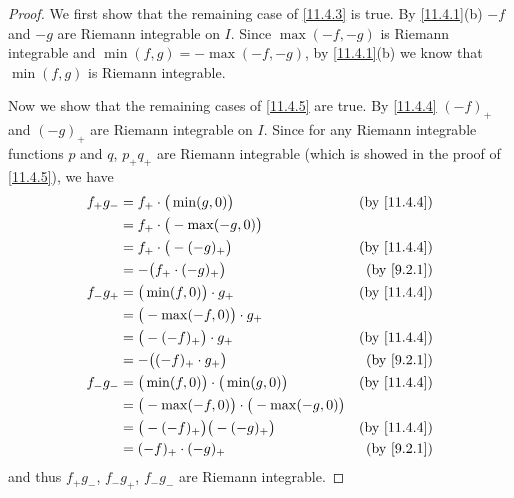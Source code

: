 \begin{proof}
  We first show that the remaining case of \cref{11.4.3} is true.
  By \cref{11.4.1}(b) \(-f\) and \(-g\) are Riemann integrable on \(I\).
  Since \(\max(-f, -g)\) is Riemann integrable and \(\min(f, g) = -\max(-f, -g)\), by \cref{11.4.1}(b) we know that \(\min(f, g)\) is Riemann integrable.

  Now we show that the remaining cases of \cref{11.4.5} are true.
  By \cref{11.4.4} \((-f)_+\) and \((-g)_+\) are Riemann integrable on \(I\).
  Since for any Riemann integrable functions \(p\) and \(q\), \(p_+ q_+\) are Riemann integrable (which is showed in the proof of \cref{11.4.5}), we have
  \begin{align*}
    f_+ g_- & = f_+ \cdot \big(\min(g, 0)\big)                      & \text{(by \cref{11.4.4})} \\
            & = f_+ \cdot \big(-\max(-g, 0)\big)                                                \\
            & = f_+ \cdot \big(-(-g)_+\big)                         & \text{(by \cref{11.4.4})} \\
            & = -\big(f_+ \cdot (-g)_+\big)                         & \text{(by \cref{9.2.1})}  \\
    f_- g_+ & = \big(\min(f, 0)\big) \cdot g_+                      & \text{(by \cref{11.4.4})} \\
            & = \big(-\max(-f, 0)\big) \cdot g_+                                                \\
            & = \big(-(-f)_+\big) \cdot g_+                         & \text{(by \cref{11.4.4})} \\
            & = -\big((-f)_+ \cdot g_+\big)                         & \text{(by \cref{9.2.1})}  \\
    f_- g_- & = \big(\min(f, 0)\big) \cdot \big(\min(g, 0)\big)     & \text{(by \cref{11.4.4})} \\
            & = \big(-\max(-f, 0)\big) \cdot \big(-\max(-g, 0)\big)                             \\
            & = \big(-(-f)_+\big) \big(-(-g)_+\big)                 & \text{(by \cref{11.4.4})} \\
            & = (-f)_+ \cdot (-g)_+                                 & \text{(by \cref{9.2.1})}
  \end{align*}
  and thus \(f_+ g_-\), \(f_- g_+\), \(f_- g_-\) are Riemann integrable.
\end{proof}